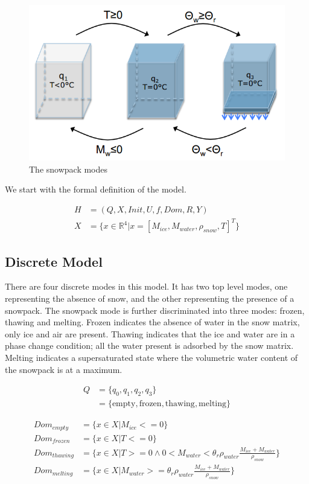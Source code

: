 \documentclass{article}
\begin{document}
\begin{figure}[h!]
\centering
\includegraphics[scale=0.7]{discrete_modes.png}
\caption{The snowpack modes}
\label{fig:snowpack-modes}
\end{figure}

We start with the formal definition of the model.

\begin{align}
H &= (Q, X, Init, U, f, Dom, R, Y) \\
X &= \{x \in \mathbb{R}^4 \big| x = \left[ M_{ice}, M_{water}, \rho_{snow}, T \right]^T\}
\end{align}

\subsection{Discrete Model}

There are four discrete modes in this model.
It has two top level modes, one representing the absence
of snow, and the other representing the presence of a snowpack.
The snowpack mode is further discriminated into three modes:
frozen, thawing and melting.
Frozen indicates the absence of water in the snow matrix,
only ice and air are present.
Thawing indicates that the ice and water are in a phase change condition;
all the water present is adsorbed by the snow matrix.
Melting indicates a supersaturated state where the
volumetric water content of the snowpack is at a maximum.

\begin{align}
Q &= \{q_0, q_1, q_2, q_3\} \\
  &= \{\text{empty}, \text{frozen}, \text{thawing}, \text{melting}\}
\end{align}

\begin{align}
Dom_{empty} &= \{x \in X \big| M_{ice} <= 0\} \\
Dom_{frozen} &= \{x \in X \big| T <= 0\} \\
Dom_{thawing} &= \{x \in X \big| T >= 0
    \wedge 0 < M_{water} <
    \theta_{r} \rho_{water} \frac{M_{ice} + M_{water}}{\rho_{snow}}\} \\
Dom_{melting} &= \{x \in X \big|  M_{water} >=
    \theta_{r} \rho_{water} \frac{M_{ice} + M_{water}}{\rho_{snow}}\}
\end{align}
\end{document}
